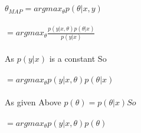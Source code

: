 \newcommand\tab[1][1cm]{\hspace*{#1}}
\begin{answer}
\\ \\
\tab$\theta_{MAP} = argmax_\theta p(\theta|x,y)$ \\ \\
\tab[2cm]$ =  argmax_\theta \frac{p(y|x,\theta)p(\theta|x)}{p(y|x)} $ \\ \\
As $p(y|x)$ is a constant So \\ \\
\tab[2cm]$ =  argmax_\theta p(y|x,\theta)p(\theta|x) $ \\ \\
As given Above $p(\theta) =p(\theta|x) So$ \\ \\ 
\tab[2cm]$ =  argmax_\theta p(y|x,\theta)p(\theta) $ \\ \\
\end{answer}
